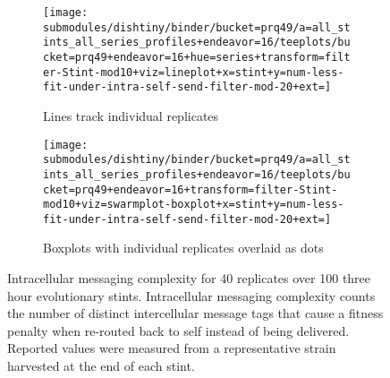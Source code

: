 \begin{figure}
\begin{center}

\begin{subfigure}[b]{\textwidth}
\centering
\texttt{[image: submodules/dishtiny/binder/bucket=prq49/a=all\_stints\_all\_series\_profiles+endeavor=16/teeplots/bucket=prq49+endeavor=16+hue=series+transform=filter-Stint-mod10+viz=lineplot+x=stint+y=num-less-fit-under-intra-self-send-filter-mod-20+ext=]}%
\caption{
Lines track individual replicates
}
\label{fig:intra-messaging-complexity-vs-stint-lineplot}
\end{subfigure}

\begin{subfigure}[b]{\columnwidth}
\centering
\texttt{[image: submodules/dishtiny/binder/bucket=prq49/a=all\_stints\_all\_series\_profiles+endeavor=16/teeplots/bucket=prq49+endeavor=16+transform=filter-Stint-mod10+viz=swarmplot-boxplot+x=stint+y=num-less-fit-under-intra-self-send-filter-mod-20+ext=]}
\caption{
Boxplots with individual replicates overlaid as dots
}
\label{fig:intra-messaging-complexity-vs-stint-boxplot}
\end{subfigure}

\caption{
Intracellular messaging complexity for 40 replicates over 100 three hour evolutionary stints.
Intracellular messaging complexity counts the number of distinct intercellular message tags that cause a fitness penalty when re-routed back to self instead of being delivered.
Reported values were measured from a representative strain harvested at the end of each stint.
}
\label{fig:intra-messaging-complexity-vs-stint}

\end{center}
\end{figure}

